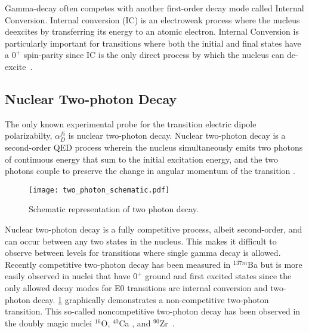 \documentclass[cnatzke_thesis_proposal.tex]{subfiles}
\begin{document}
Gamma-decay often competes with another first-order decay mode called Internal Conversion. 
Internal conversion (IC) is an electroweak process where the nucleus deexcites by transferring its energy to an atomic electron. 
Internal Conversion is particularly important for transitions where both the initial and final states have a $0^+$ spin-parity since IC is the only direct process by which the nucleus can de-excite~\cite{krane_introductory_1987}.

\subsection{Nuclear Two-photon Decay}

The only known experimental probe for the transition electric dipole polarizabilty, $\alpha_D^{fi}$ is nuclear two-photon decay.
Nuclear two-photon decay is a second-order QED process wherein the nucleus simultaneously emits two photons of continuous energy that sum to the initial excitation energy, and the two photons couple to preserve the change in angular momentum of the transition \cite{kramp_nuclear_1987}.

\begin{figure}[H]
    \centering
    \texttt{[image: two\_photon\_schematic.pdf]}
    \caption{Schematic representation of two photon decay.}
    \label{fig:two_photon_schematic}
\end{figure}

Nuclear two-photon decay is a fully competitive process, albeit second-order, and can occur between any two states in the nucleus. 
This makes it difficult to observe between levels  for transitions where single gamma decay is allowed. Recently competitive two-photon decay has been measured in $^{137m}$Ba \cite{soderstrom_electromagnetic_2020} but is more easily observed in nuclei that have $0^+$ ground and first excited states since the only allowed decay modes for E0 transitions are internal conversion and two-photon decay. 
\ref{fig:two_photon_schematic} graphically demonstrates a non-competitive two-photon transition.
This so-called noncompetitive two-photon decay has been observed in the doubly magic nuclei $^{16}$O, $^{40}$Ca \cite{schirmer_double_1984}, and $^{90}$Zr~\cite{schirmer_double_1984}. 

\end{document}
